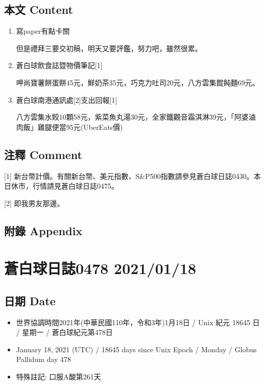 \documentclass[a5paper, 10pt
]{book}
\providecommand{\tightlist}{%
  \setlength{\itemsep}{0pt}\setlength{\parskip}{0pt}}
\begin{document}
\hypertarget{ux672cux6587-content-47}{%
\subsection{本文 Content}\label{ux672cux6587-content-47}}

\begin{enumerate}
\def\labelenumi{\arabic{enumi}.}
\item
  寫paper有點卡關

  但是禮拜三要交初稿，明天又要評鑑，努力吧，雖然很累。
\item
  蒼白球飲食誌暨物價筆記{[}1{]}

  呷尚寶薯餅蛋餅45元，鮮奶茶35元，巧克力吐司20元，八方雲集餛飩麵69元。
\item
  蒼白球南港通訊處{[}2{]}支出回報{[}1{]}

  八方雲集水餃10顆58元，紫菜魚丸湯30元，全家鐵觀音霜淇淋39元，「阿婆滷肉飯」雞腿便當95元(UberEats價)
\end{enumerate}

\hypertarget{ux6ce8ux91cb-comment-47}{%
\subsection{注釋 Comment}\label{ux6ce8ux91cb-comment-47}}

{[}1{]}
新台幣計價。有關新台幣、美元指數、S\&P500指數請參見蒼白球日誌0430。本日休市，行情請見蒼白球日誌0475。

{[}2{]} 即我男友那邊。

\hypertarget{ux9644ux9304-appendix-47}{%
\subsection{附錄 Appendix}\label{ux9644ux9304-appendix-47}}

\hypertarget{ux84bcux767dux7403ux65e5ux8a8c0478-20210118}{%
\section{蒼白球日誌0478
2021/01/18}\label{ux84bcux767dux7403ux65e5ux8a8c0478-20210118}}

\hypertarget{ux65e5ux671f-date-48}{%
\subsection{日期 Date}\label{ux65e5ux671f-date-48}}

\begin{itemize}
\tightlist
\item
  世界協調時間2021年(中華民國110年，令和3年)1月18日 / Unix 紀元 18645 日
  / 星期一 / 蒼白球紀元第478日
\item
  January 18, 2021 (UTC) / 18645 days since Unix Epoch / Monday / Globus
  Pallidum day 478
\item
  特殊註記: 口服A酸第261天
\end{itemize}
\end{document}
